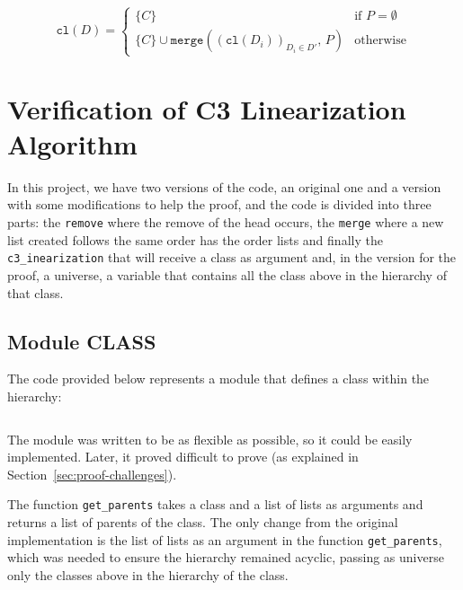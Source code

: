 \documentclass[runningheads]{llncs}
\newcommand*{\mer}{\texttt{merge}}
\begin{document}
\[
\texttt{cl}(D) =
\begin{cases}
\{C\} & \text{if } P = \emptyset \\
\{C\} \cup \mer\left( \left( \texttt{cl}(D_i) \right)_{D_i \in D'},\, P \right) & \text{otherwise}
\end{cases}
\]

\section{Verification of C3 Linearization Algorithm}

In this project, we have two versions of the code, an original one and a version with some modifications to help the proof,
 and the code is divided into three parts: the \texttt{remove} where the remove of the head occurs, 
 the \texttt{merge} where a new list created follows the same order has the order lists and finally the \texttt{c3\_inearization} that will receive a class as argument and,
  in the version for the proof, a universe, a variable that contains all the class above in the hierarchy of that class.

\subsection{Module CLASS}

The code provided below represents a module that defines a class within the hierarchy:
\inputminted[firstline=4,lastline=22,fontsize=\small,linenos,xleftmargin=20pt]{ocaml}{../cameleer/c3.ml} 
The module was written to be as flexible as possible, so it could be easily implemented.
Later, it proved difficult to prove (as explained in Section~\ref{sec:proof-challenges}).

The function \texttt{get\_parents} takes a class and a list of lists as arguments and returns a list of parents of the class.
The only change from the original implementation is the list of lists as an argument in the function 
\texttt{get\_parents}, which was needed to ensure the hierarchy remained acyclic,
 passing as universe only the classes above in the hierarchy of the class.
\end{document}
